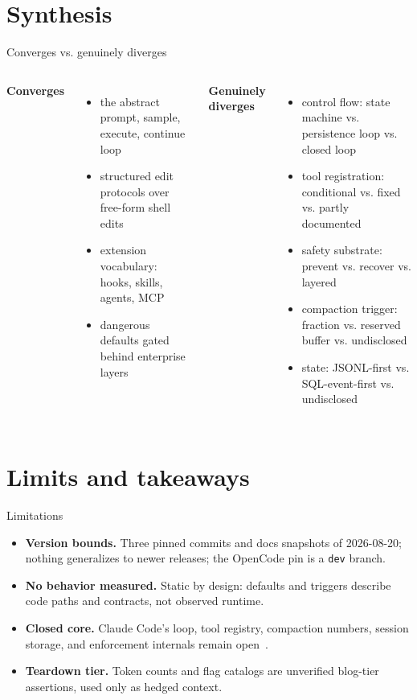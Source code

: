 \documentclass[aspectratio=169,11pt]{beamer}
\newcommand{\occ}[0]{OpenCode}
\newcommand{\ccc}[0]{Claude Code}
\begin{document}
\section{Synthesis}

\begin{frame}{Converges vs. genuinely diverges}
  \begin{columns}[T]
      \textbf{Converges}
      \begin{itemize}
        \item the abstract prompt, sample, execute, continue loop
        \item structured edit protocols over free-form shell edits
        \item extension vocabulary: hooks, skills, agents, MCP
        \item dangerous defaults gated behind enterprise layers
      \end{itemize}
      \textbf{Genuinely diverges}
      \begin{itemize}
        \item control flow: state machine vs. persistence loop vs.
          closed loop
        \item tool registration: conditional vs. fixed vs. partly
          documented
        \item safety substrate: prevent vs. recover vs. layered
        \item compaction trigger: fraction vs. reserved buffer vs.
          undisclosed
        \item state: JSONL-first vs. SQL-event-first vs. undisclosed
      \end{itemize}
  \end{columns}
\end{frame}

\section{Limits and takeaways}

\begin{frame}{Limitations}
  \begin{itemize}
    \item \textbf{Version bounds.} Three pinned commits and docs
      snapshots of 2026-08-20; nothing generalizes to newer releases; the
      \occ{} pin is a \texttt{dev} branch.
    \item \textbf{No behavior measured.} Static by design: defaults and
      triggers describe code paths and contracts, not observed runtime.
    \item \textbf{Closed core.} \ccc{}'s loop, tool registry, compaction
      numbers, session storage, and enforcement internals remain open~\citep{claudeCodeSurface}.
    \item \textbf{Teardown tier.} Token counts and flag catalogs are
      unverified blog-tier assertions, used only as hedged context.
  \end{itemize}
\end{frame}
\end{document}
